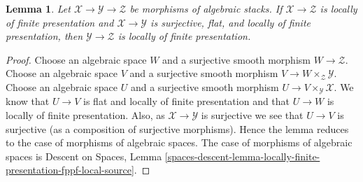 \documentclass[10pt,a4paper]{amsart}
\theoremstyle{plain}
\newtheorem{lemma}[subsection]{Lemma}
\theoremstyle{definition}
\theoremstyle{remark}
\numberwithin{equation}{subsection}
\begin{document}
\begin{lemma}
\label{lemma-flat-finite-presentation-permanence}
Let $\mathcal{X} \to \mathcal{Y} \to \mathcal{Z}$ be morphisms of
algebraic stacks. If $\mathcal{X} \to \mathcal{Z}$ is locally of finite
presentation and $\mathcal{X} \to \mathcal{Y}$ is surjective, flat, and
locally of finite presentation, then $\mathcal{Y} \to \mathcal{Z}$
is locally of finite presentation.
\end{lemma}

\begin{proof}
Choose an algebraic space $W$ and a surjective smooth morphism
$W \to \mathcal{Z}$. Choose an algebraic space $V$ and a surjective smooth
morphism $V \to W \times_\mathcal{Z} \mathcal{Y}$. Choose an algebraic space
$U$ and a surjective smooth morphism $U \to V \times_\mathcal{Y} \mathcal{X}$.
We know that $U \to V$ is flat and locally of finite presentation
and that $U \to W$ is locally of finite presentation.
Also, as $\mathcal{X} \to \mathcal{Y}$ is surjective we see that
$U \to V$ is surjective (as a composition of surjective morphisms).
Hence the lemma reduces to the case of morphisms of algebraic spaces.
The case of morphisms of algebraic spaces is
Descent on Spaces, Lemma
\ref{spaces-descent-lemma-locally-finite-presentation-fppf-local-source}.
\end{proof}
\end{document}

